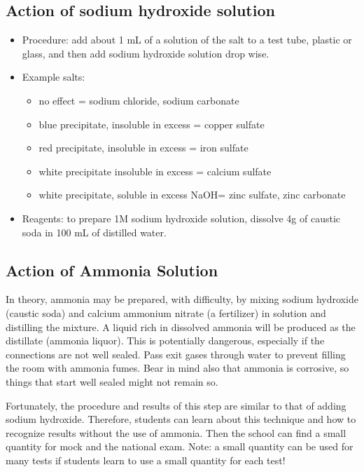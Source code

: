 \subsection{Action of sodium hydroxide solution}
\begin{itemize}
\item{Procedure: add about 1 mL of a solution of the salt to a test tube, 
plastic or glass, 
and then add sodium hydroxide solution drop wise.}
\item{Example salts:}
\begin{itemize}
\item{no effect = sodium chloride, 
sodium carbonate}
\item{blue precipitate, 
insoluble in excess = copper sulfate}
\item{red precipitate, 
insoluble in excess = iron sulfate}
\item{white precipitate insoluble in excess = calcium sulfate}
\item{white precipitate, 
soluble in excess NaOH= zinc sulfate, 
zinc carbonate}
\end{itemize}
\item{Reagents: to prepare 1M sodium hydroxide solution, 
dissolve 4g of caustic soda in 100 mL of distilled water.}
\end{itemize}

\subsection{Action of Ammonia Solution}
In theory, 
ammonia may be prepared, 
with difficulty, 
by mixing sodium hydroxide (caustic soda) 
and calcium ammonium nitrate (a fertilizer) in solution 
and distilling the mixture. 
A liquid rich in dissolved ammonia will be produced 
as the distillate (ammonia liquor). 
This is potentially dangerous, 
especially if the connections are not well sealed. 
Pass exit gases through water to prevent filling the room 
with ammonia fumes. 
Bear in mind also that ammonia is corrosive, 
so things that start well sealed might not remain so. 

Fortunately, 
the procedure and results of this step are similar 
to that of adding sodium hydroxide. 
Therefore, 
students can learn about this technique 
and how to recognize results without the use of ammonia. 
Then the school can find a small quantity for mock and the national exam.
Note: a small quantity can be used for many tests 
if students learn to use a small quantity for each test!

